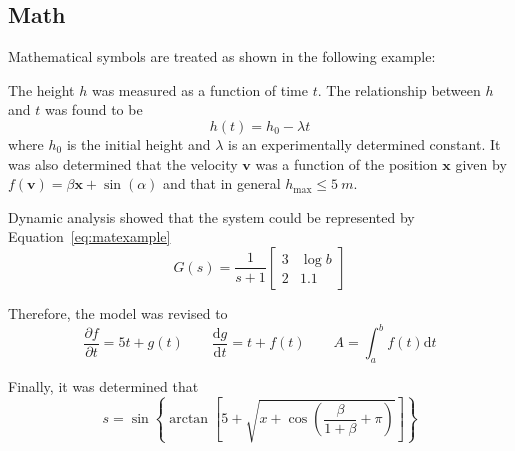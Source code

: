 \documentclass[a5paper, 10pt]{article}
\begin{document}
\clearpage
\subsection{Math}
Mathematical symbols are treated as shown in the following example:

The height $h$ was measured as a function of time $t$.  The relationship between $h$ and $t$ was found to be 
\begin{equation}
  \label{eq:commaexample}
  h(t) = h_0 - \lambda t
\end{equation}
where $h_0$ is the initial height and $\lambda$ is an experimentally
determined constant.  It was also determined that the velocity
$\mathbf{v}$ was a function of the position $\mathbf{x}$ given by
$f(\mathbf{v}) = \beta \mathbf{x} + \sin(\alpha)$ and that in general
$h_{\mathrm{max}} \leq \SI{5}{m}$.

Dynamic analysis showed that the system could be represented by
Equation~\ref{eq:matexample}
\begin{equation}
  \label{eq:matexample}
  G(s) = \frac{1}{s+1}\left [ 
    \begin{array}{cc} 
      3 & \log{b} \\ 
      2 & \num{1.1} 
    \end{array} \right ]
\end{equation}

Therefore, the model was revised to
\begin{equation}
  \frac{\partial f}{\partial t} = 5t + g(t) \qquad \frac{\mathrm{d} g}{\mathrm{d} t} = t + f(t) \qquad A = \int_a^b f(t) \mathrm{d} t
\end{equation}

Finally, it was determined that
\begin{equation}
  s = \sin\left \{ \arctan \left [  5 +  \sqrt{x + \cos\left(\frac{\beta}{1+\beta} + \pi\right)} \right ] \right \}
\end{equation}
\end{document}

